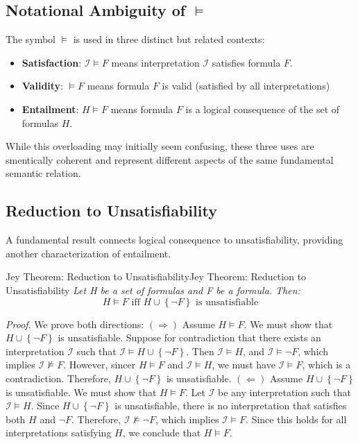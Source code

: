 \documentclass[a4paper]{article}
\theoremstyle{definition}
\begin{document}
\subsection{Notational Ambiguity of \( \models \)}
The symbol \( \models \) is used in three distinct but related contexts:
\begin{itemize}
	\item \textbf{Satisfaction}: \( \mathcal{I} \models F \) means interpretation \( \mathcal{I} \) satisfies formula \( F \).
	\item \textbf{Validity}: \( \models F \) means formula \( F \) is valid (satisfied by all interpretations)
	\item \textbf{Entailment}: \( H \models F \) means formula \( F \) is a logical consequence of the set of formulas \( H \).
\end{itemize}
While this overloading may initially seem confusing, these three uses are smentically coherent and represent different aspects of the same fundamental 
semantic relation.
\subsection{Reduction to Unsatisfiability}
A fundamental result connects logical consequence to unsatisfiability, providing another characterization of entailment.
\begin{theorem}{Jey Theorem: Reduction to Unsatisfiability}{Jey Theorem: Reduction to Unsatisfiability}
\textit{Let H be a set of formulas and F be a formula. Then:}
\[
  H \models F \text{ iff } H \cup \left\{ \lnot F \right\} \text{ is unsatisfiable}
\]
\end{theorem}
\textit{Proof}. We prove both directions:
\vspace{1em}
\noindent
\newline
\( (\Rightarrow) \) Assume \( H \models F \). We must show that \( H \cup \left\{ \lnot F \right\} \) is unsatisfiable.
\vspace{1em}
\noindent
\newline
Suppose for contradiction that there exists an interpretation \( \mathcal{I} \) such that \( \mathcal{I} \models H \cup \left\{ \lnot F \right\} \). Then 
\( \mathcal{I} \models H \), and \( \mathcal{I} \models \lnot F \), which implies \( \mathcal{I} \nvDash F \). However, sincer \( H \models F \) and \( \mathcal{I} \models H \),
we must have \( \mathcal{I} \models F \), which is a contradiction. Therefore, \( H \cup \left\{ \lnot F \right\} \) is unsatisfiable.
\vspace{1em}
\noindent
\newline
\( (\Leftarrow) \) Assume \( H \cup \left\{ \lnot F \right\} \) is unsatisfiable. We must show that \( H \models F \).
\vspace{1em}
\noindent
\newline
Let \( \mathcal{I} \) be any interpretation such that \( \mathcal{I} \models H \). Since \( H \cup \left\{ \lnot F \right\} \) is unsatisfiable,
there is no interpretation that satisfies both \( H \) and \( \lnot F \). Therefore, \( \mathcal{I} \nvDash \lnot F \), which implies \( \mathcal{I} \models F \). Since
this holds for all interpretations satisfying \( H \), we conclude that \( H \models F \).
\end{document}
